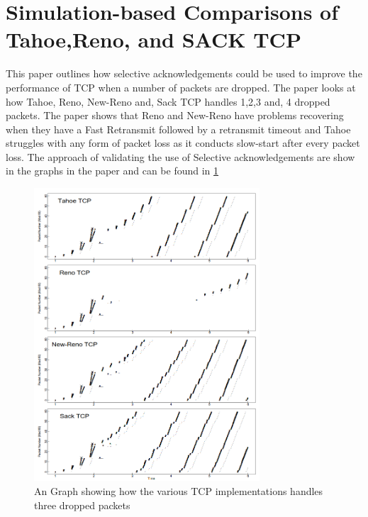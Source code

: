 \documentclass[a4paper,12pt]{scrartcl}
\begin{document}
	\section{Simulation-based Comparisons of Tahoe,Reno, and SACK TCP\cite{FallFloydTahoeRenoSack}}
	{
		This paper outlines how selective acknowledgements could be used to improve the performance of TCP when a number of packets are dropped. The paper looks at how Tahoe, Reno, New-Reno and, Sack TCP handles 1,2,3 and, 4 dropped packets. The paper shows that Reno and New-Reno have problems recovering when they have a Fast Retransmit followed by a retransmit timeout and Tahoe struggles with any form of packet loss as it conducts slow-start after every packet loss. The approach of validating the use of Selective acknowledgements are show in the graphs in the paper and can be found in \cref{fig:CoparisonOfTCPWith4DroppedPackets}
		\begin{figure}[h]
			\centering
			\includegraphics[width=0.75\textwidth]{CoparisonOfTCPWith4DroppedPackets}
			\caption{An Graph showing how the various TCP implementations handles three dropped packets\cite{FallFloydTahoeRenoSack}}
			\label{fig:CoparisonOfTCPWith4DroppedPackets}
		\end{figure}
	}
\end{document}
